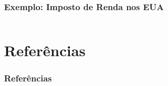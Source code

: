 \documentclass[xcolor={dvipsnames,table},aspectratio=169]{beamer}
\begin{document}
\begin{frame}[fragile]\frametitle{Exemplo: Imposto de Renda nos EUA}
\tiny{\inputminted[bgcolor=cyan!10]{java}{src/ImpostoEUA.java}}		
\end{frame}

\section{Referências}

\begin{frame}\frametitle{Referências}
\end{frame}

\end{document}
